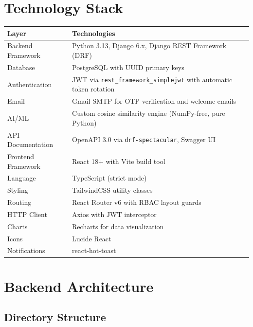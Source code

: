 \documentclass[12pt, a4paper]{article}
\begin{document}
\section{Technology Stack}

\begin{longtable}{p{4cm}p{10cm}}
\toprule
\textbf{Layer} & \textbf{Technologies} \\
\midrule
\endhead
Backend Framework & Python 3.13, Django 6.x, Django REST Framework (DRF) \\
Database & PostgreSQL with UUID primary keys \\
Authentication & JWT via \texttt{rest\_framework\_simplejwt} with automatic token rotation \\
Email & Gmail SMTP for OTP verification and welcome emails \\
AI/ML & Custom cosine similarity engine (NumPy-free, pure Python) \\
API Documentation & OpenAPI 3.0 via \texttt{drf-spectacular}, Swagger UI \\
Frontend Framework & React 18+ with Vite build tool \\
Language & TypeScript (strict mode) \\
Styling & TailwindCSS utility classes \\
Routing & React Router v6 with RBAC layout guards \\
HTTP Client & Axios with JWT interceptor \\
Charts & Recharts for data visualization \\
Icons & Lucide React \\
Notifications & react-hot-toast \\
\bottomrule
\end{longtable}

\section{Backend Architecture}

\subsection{Directory Structure}
\end{document}
